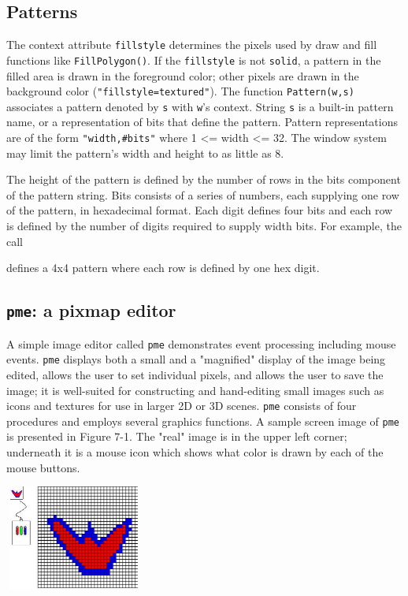 \subsection{Patterns}

The context attribute \texttt{fillstyle} determines the pixels used by
draw and fill functions like \texttt{FillPolygon()}.  If the
\texttt{fillstyle} is not \texttt{solid}, a pattern in the filled area
is drawn in the foreground color; other pixels are drawn in the
background color (\texttt{"fillstyle=textured"}).  The function
\texttt{Pattern(w,s)} associates a pattern denoted by \texttt{s} with
\texttt{w}'s context. String \texttt{s} is a built-in pattern name, or
a representation of bits that define the pattern. Pattern
representations are of the form \texttt{"width,\#bits"} where 1
{\textless}= width {\textless}= 32. The window system may limit the
pattern's width and height to as little as 8.

The height of the pattern is defined by the number of rows in the bits
component of the pattern string. Bits consists of a series of numbers,
each supplying one row of the pattern, in hexadecimal format.  Each
digit defines four bits and each row is defined by the number of
digits required to supply width bits. For example, the call


\noindent defines a 4x4 pattern where each row is defined by one hex digit.

\subsection{\texttt{pme}: a pixmap editor}

A simple image editor called \texttt{pme} demonstrates event
processing including mouse events. \texttt{pme} displays both a small
and a "magnified" display of the image being edited, allows the user
to set individual pixels, and allows the user to save the image; it is
well-suited for constructing and hand-editing small images such as
icons and textures for use in larger 2D or 3D scenes.  \texttt{pme}
consists of four procedures and employs several graphics functions. A
sample screen image of \texttt{pme} is presented in Figure 7-1. The
"real" image is in the upper left corner; underneath it is a mouse
icon which shows what color is drawn by each of the mouse buttons.



\begin{center}
\includegraphics[width=1.7917in,height=1.3575in]{ub-img/ub-img11.jpg}
\end{center}

